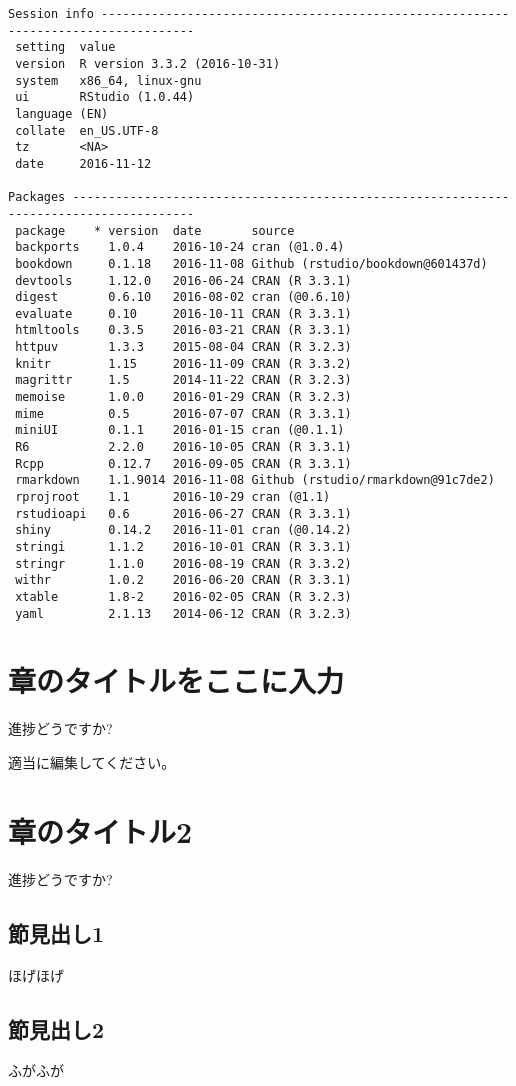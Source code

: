\documentclass[]{book}
\begin{document}
\begin{verbatim}
Session info -----------------------------------------------------------------------------------
 setting  value                       
 version  R version 3.3.2 (2016-10-31)
 system   x86_64, linux-gnu           
 ui       RStudio (1.0.44)            
 language (EN)                        
 collate  en_US.UTF-8                 
 tz       <NA>                        
 date     2016-11-12                  

Packages ---------------------------------------------------------------------------------------
 package    * version  date       source                            
 backports    1.0.4    2016-10-24 cran (@1.0.4)                     
 bookdown     0.1.18   2016-11-08 Github (rstudio/bookdown@601437d) 
 devtools     1.12.0   2016-06-24 CRAN (R 3.3.1)                    
 digest       0.6.10   2016-08-02 cran (@0.6.10)                    
 evaluate     0.10     2016-10-11 CRAN (R 3.3.1)                    
 htmltools    0.3.5    2016-03-21 CRAN (R 3.3.1)                    
 httpuv       1.3.3    2015-08-04 CRAN (R 3.2.3)                    
 knitr        1.15     2016-11-09 CRAN (R 3.3.2)                    
 magrittr     1.5      2014-11-22 CRAN (R 3.2.3)                    
 memoise      1.0.0    2016-01-29 CRAN (R 3.2.3)                    
 mime         0.5      2016-07-07 CRAN (R 3.3.1)                    
 miniUI       0.1.1    2016-01-15 cran (@0.1.1)                     
 R6           2.2.0    2016-10-05 CRAN (R 3.3.1)                    
 Rcpp         0.12.7   2016-09-05 CRAN (R 3.3.1)                    
 rmarkdown    1.1.9014 2016-11-08 Github (rstudio/rmarkdown@91c7de2)
 rprojroot    1.1      2016-10-29 cran (@1.1)                       
 rstudioapi   0.6      2016-06-27 CRAN (R 3.3.1)                    
 shiny        0.14.2   2016-11-01 cran (@0.14.2)                    
 stringi      1.1.2    2016-10-01 CRAN (R 3.3.1)                    
 stringr      1.1.0    2016-08-19 CRAN (R 3.3.2)                    
 withr        1.0.2    2016-06-20 CRAN (R 3.3.1)                    
 xtable       1.8-2    2016-02-05 CRAN (R 3.2.3)                    
 yaml         2.1.13   2014-06-12 CRAN (R 3.2.3)     
\end{verbatim}

\chapter{章のタイトルをここに入力}

進捗どうですか?

適当に編集してください。

\chapter{章のタイトル2}\label{2}

進捗どうですか?

\section{節見出し1}\label{1}

ほげほげ

\section{節見出し2}\label{2}

ふがふが
\end{document}
